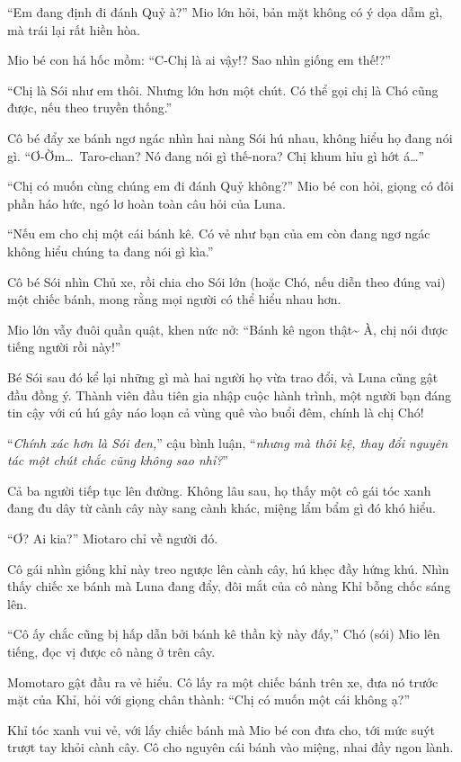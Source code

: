 \documentclass[../main.tex]{subfiles}
\begin{document}
``Em đang định đi đánh Quỷ à?'' Mio lớn hỏi, bản mặt không có ý dọa dẫm gì, mà trái lại rất hiền hòa.

Mio bé con há hốc mồm: ``C-Chị là ai vậy!? Sao nhìn giống em thế!?''

``Chị là Sói như em thôi. Nhưng lớn hơn một chút. Có thể gọi chị là Chó cũng được, nếu theo truyền thống.''

Cô bé đẩy xe bánh ngơ ngác nhìn hai nàng Sói hú nhau, không hiểu họ đang nói gì. ``Ơ-Ờm\dots\ Taro-chan? Nó đang nói gì thế-nora? Chị khum hỉu gì hớt á\dots''

``Chị có muốn cùng chúng em đi đánh Quỷ không?'' Mio bé con hỏi, giọng có đôi phần háo hức, ngó lơ hoàn toàn câu hỏi của Luna.

``Nếu em cho chị một cái bánh kê. Có vẻ như bạn của em còn đang ngơ ngác không hiểu chúng ta đang nói gì kìa.''

Cô bé Sói nhìn Chủ xe, rồi chia cho Sói lớn (hoặc Chó, nếu diễn theo đúng vai) một chiếc bánh, mong rằng mọi người có thể hiểu nhau hơn.

Mio lớn vẫy đuôi quần quật, khen nức nở: ``Bánh kê ngon thật\~{} À, chị nói được tiếng người rồi này!''

Bé Sói sau đó kể lại những gì mà hai người họ vừa trao đổi, và Luna cũng gật đầu đồng ý. Thành viên đầu tiên gia nhập cuộc hành trình, một người bạn đáng tin cậy với cú hú gây náo loạn cả vùng quê vào buổi đêm, chính là chị Chó!

``\textit{Chính xác hơn là Sói đen,}'' cậu bình luận, ``\textit{nhưng mà thôi kệ, thay đổi nguyên tác một chút chắc cũng không sao nhỉ?}''

\ct

Cả ba người tiếp tục lên đường. Không lâu sau, họ thấy một cô gái tóc xanh đang đu dây từ cành cây này sang cành khác, miệng lẩm bẩm gì đó khó hiểu.

``Ơ? Ai kia?'' Miotaro chỉ về người đó.

Cô gái nhìn giống khỉ này treo ngược lên cành cây, hú khẹc đầy hứng khú. Nhìn thấy chiếc xe bánh mà Luna đang đẩy, đôi mắt của cô nàng Khỉ bỗng chốc sáng lên.

``Cô ấy chắc cũng bị hấp dẫn bởi bánh kê thần kỳ này đấy,'' Chó (sói) Mio lên tiếng, đọc vị được cô nàng ở trên cây.

Momotaro gật đầu ra vẻ hiểu. Cô lấy ra một chiếc bánh trên xe, đưa nó trước mặt của Khỉ, hỏi với giọng chân thành: ``Chị có muốn một cái không ạ?''

Khỉ tóc xanh vui vẻ, với lấy chiếc bánh mà Mio bé con đưa cho, tới mức suýt trượt tay khỏi cành cây. Cô cho nguyên cái bánh vào miệng, nhai đầy ngon lành.
\end{document}
